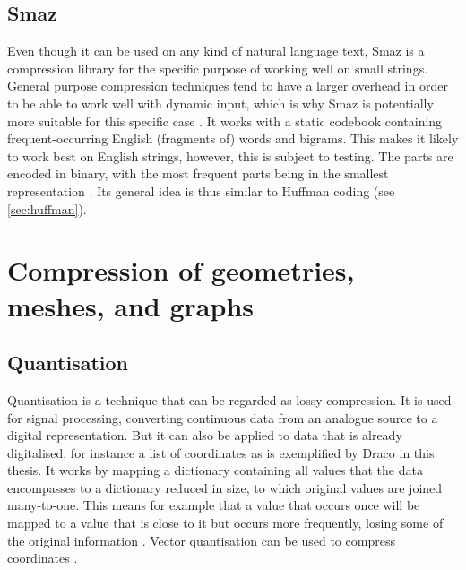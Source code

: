 \subsection{Smaz}
\label{sec:smaz}
Even though it can be used on any kind of natural language text, Smaz is a compression library for the specific purpose of working well on small strings.
General purpose compression techniques tend to have a larger overhead in order to be able to work well with dynamic input, which is why Smaz is potentially more suitable for this specific case \citep{antirez}.
It works with a static codebook containing frequent-occurring English (fragments of) words and bigrams. 
This makes it likely to work best on English strings, however, this is subject to testing.
The parts are encoded in binary, with the most frequent parts being in the smallest representation \citep{antirez2}.
Its general idea is thus similar to Huffman coding (see \ref{sec:huffman}).



\section{Compression of geometries, meshes, and graphs}
\subsection{Quantisation}
\label{theoryquantisation}

Quantisation is a technique that can be regarded as lossy compression.
It is used for signal processing, converting continuous data from an analogue source to a digital representation.
But it can also be applied to data that is already digitalised, for instance a list of coordinates as is exemplified by Draco in this thesis.
It works by mapping a dictionary containing all values that the data encompasses to a dictionary reduced in size, to which original values are joined many-to-one.
This means for example that a value that occurs once will be mapped to a value that is close to it but occurs more frequently, losing some of the original information \citep{sayood2017introduction}.
Vector quantisation can be used to compress coordinates \citep{rossignac20013d}.


